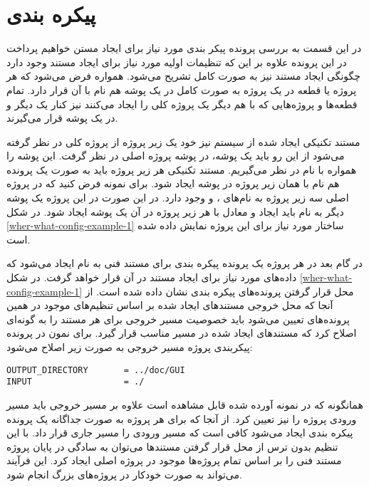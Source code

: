
\section{پیکره بندی}
در این قسمت به بررسی پرونده پیکر بندی مورد نیاز برای ایجاد مستن خواهیم پرداخت
در این پرونده علاوه بر این که تنظیمات اولیه مورد نیاز برای ایجاد مستند وجود
دارد چگونگی ایجاد مستند نیز به صورت کامل تشریح می‌شود. همواره فرض می‌شود که هر
پروژه یا قطعه در یک پروژه به صورت کامل در یک پوشه هم نام با آن قرار دارد. تمام
قطعه‌ها و پروژه‌هایی که با هم دیگر یک پروژه کلی را ایجاد می‌کنند نیز کنار یک
دیگر و در یک پوشه قرار می‌گیرند.

مستند تکنیکی ایجاد شده از سیستم نیز خود یک زیر پروژه از پروژه کلی در نظر گرفته
می‌شود از این رو باید یک پوشه، در پوشه پروژه اصلی در نظر گرفت. این پوشه را
همواره با نام  در نظر می‌گیریم. مستند تکنیکی هر زیر پروژه باید به صورت
یک پرونده هم نام با همان زیر پروژه در پوشه  ایجاد شود. برای نمونه فرض
کنید که در پروژه اصلی سه زیر پروژه به نام‌های ،  و 
وجود دارد. در این صورت در این پروژه یک پوشه دیگر به نام  باید ایجاد
و معادل با هر زیر پروژه در آن یک پوشه ایجاد شود. در شکل
\ref{wher-what-config-example-1} ساختار مورد نیاز برای این پروژه نمایش داده
شده است.

در گام بعد در هر پروژه یک پرونده پیکره بندی برای مستند فنی به نام 
ایجاد می‌شود که داده‌های مورد نیاز برای ایجاد مستند در آن قرار خواهد گرفت. در
شکل \ref{wher-what-config-example-1} محل قرار گرفتن پرونده‌های پیکره بندی نشان
داده شده است. از آنجا که محل خروجی مستندهای ایجاد شده بر اساس تنظیم‌های موجود
در همین پرونده‌های تعیین می‌شود باید خصوصیت مسیر خروجی برای هر مستند را به
گونه‌ای اصلاح کرد که مستندهای ایجاد شده در مسیر مناسب قرار گیرد. برای نمون در
پرونده پیکربندی پروژه  مسیر خروجی به صورت زیر اصلاح می‌شود:

\begin{latin}
\lstset{language=bash}  
\begin{lstlisting}[frame=single] 
OUTPUT_DIRECTORY       = ../doc/GUI
INPUT                  = ./
\end{lstlisting}
\end{latin}

همانگونه که در نمونه آورده شده قابل مشاهده است علاوه بر مسیر خروجی باید مسیر
ورودی پروژه را نیز تعیین کرد. از آنجا که برای هر پروژه به صورت جداگانه یک پرونده
پیکره بندی ایجاد می‌شود کافی است که مسیر ورودی را مسیر جاری قرار داد. با این
تنظیم بدون ترس از محل قرار گرفتن مستند‌ها می‌توان به سادگی در پایان پروژه مستند
فنی را بر اساس تمام پروژه‌ها موجود در پروژه اصلی ایجاد کرد. این فرآیند می‌تواند
به صورت خودکار در پروژه‌های بزرگ انجام شود.

